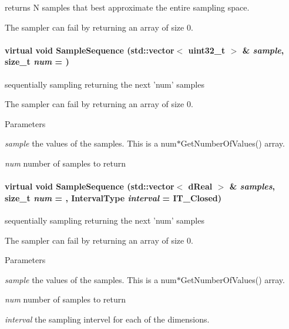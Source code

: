returns N samples that best approximate the entire sampling space. 

The sampler can fail by returning an array of size 0. \hypertarget{classOpenRAVE_1_1SpaceSamplerBase_a34363c72ec66a1249f4c94000d15fd7b}{
\paragraph[{SampleSequence}]{\setlength{\rightskip}{0pt plus 5cm}virtual void SampleSequence (std::vector$<$ uint32\_\-t $>$ \& {\em sample}, \/  size\_\-t {\em num} = {})}\hfill}
\label{classOpenRAVE_1_1SpaceSamplerBase_a34363c72ec66a1249f4c94000d15fd7b}


sequentially sampling returning the next 'num' samples 

The sampler can fail by returning an array of size 0. 
\begin{DoxyParams}{Parameters}
\item[{\em sample}]the values of the samples. This is a num$\ast$GetNumberOfValues() array. \item[{\em num}]number of samples to return \end{DoxyParams}
\hypertarget{classOpenRAVE_1_1SpaceSamplerBase_ac7edf671cbb636f75edb247680ea6a87}{
\paragraph[{SampleSequence}]{\setlength{\rightskip}{0pt plus 5cm}virtual void SampleSequence (std::vector$<$ dReal $>$ \& {\em samples}, \/  size\_\-t {\em num} = {}, \/  {\bf IntervalType} {\em interval} = {\ttfamily IT\_\-Closed})}\hfill}
\label{classOpenRAVE_1_1SpaceSamplerBase_ac7edf671cbb636f75edb247680ea6a87}


sequentially sampling returning the next 'num' samples 

The sampler can fail by returning an array of size 0. 
\begin{DoxyParams}{Parameters}
\item[{\em sample}]the values of the samples. This is a num$\ast$GetNumberOfValues() array. \item[{\em num}]number of samples to return \item[{\em interval}]the sampling intervel for each of the dimensions. \end{DoxyParams}
